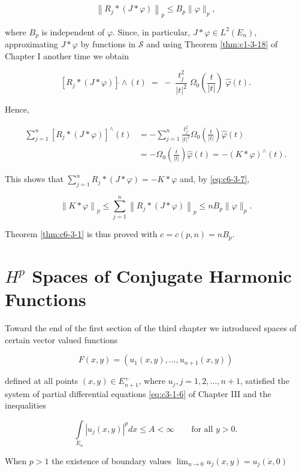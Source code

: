 \begin{equation}\label{eq:c6-3-7}
\left\|R_{j}*(J*\varphi)\right\|_{p}\leq B_{p}\|\varphi\|_{p},
\end{equation}

where $B_p$ is independent of $\varphi$. Since, in particular, $J * \varphi \in L^2(E_n)$, approximating $J * \varphi$ by functions in $\mathcal{S}$ and using Theorem \ref{thm:c1-3-18} of Chapter I another time we obtain

\[
[R_{j}*(J*\varphi)]\hat{}\wedge(t)\;=\;-\;\frac{t_{j}^{2}}{|t|^{2}}\;\Omega_{0}\left(\frac{t}{|t|}\right)\;\hat{\varphi}(t).
\]

Hence,

\[
\begin{aligned}\sum_{j=1}^{n}[R_{j}*(J*\varphi)]^{\wedge}(t)&=-\sum_{j=1}^{n}\frac{t_{j}^{2}}{|t|^{2}}\Omega_{0}\left(\frac{t}{|t|}\right)\hat{\varphi}(t)\\&=-\Omega_{0}\left(\frac{t}{|t|}\right)\hat{\varphi}(t)=-(K*\varphi)^{\wedge}(t).\end{aligned}
\]

This shows that $\sum_{j=1}^{n} R_j * (J * \varphi) = -K * \varphi$ and, by \eqref{eq:c6-3-7},

\[
\left\|K*\varphi\right\|_{p}\leq\sum_{j=1}^{n}\left\|R_{j}*(J*\varphi)\right\|_{p}\leq n B_{p}\|\varphi\|_{p}.
\]

Theorem \ref{thm:c6-3-1} is thus proved with $c = c(p, n) = nB_{p}$.

\section{$H^{p}$ Spaces of Conjugate Harmonic Functions}

Toward the end of the first section of the third chapter we introduced spaces of certain vector valued functions

\[
F(x,y)=(u_{1}(x,y),\ldots,u_{n+1}(x,y))
\]

defined at all points $(x, y) \in E_{n+1}^{+}$, where $u_j, j = 1, 2, \ldots, n + 1$, satisfied the system of partial differential equations \eqref{eq:c3-1-6} of Chapter III and the inequalities

\begin{equation}\label{eq:c6-4-1}
\int\limits_{E_{n}}|u_{j}(x,y)|^{p} dx\leq A<\infty\qquad\text{for all }y>0.
\end{equation}

When $p > 1$ the existence of boundary values $\lim_{u \to 0} u_j(x, y) = u_j(\dot{x}, 0)$

